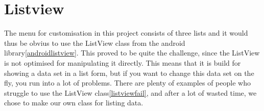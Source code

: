\section{Listview}

The menu for customisation in this project consists of three lists and it would thus be obvius to use the ListView class from the android library\autoref{androidlistview}. This proved to be quite the challenge, since the ListView is not optimised for manipulating it directly. This means that it is build for showing a data set in a list form, but if you want to change this data set on the fly, you run into a lot of problems. There are plenty of examples of people who struggle to use the ListView class\autoref{listviewfail}, and after a lot of wasted time, we chose to make our own class for listing data.
